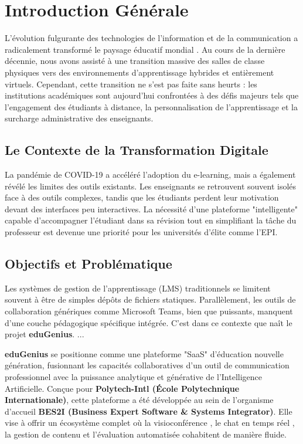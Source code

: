 \chapter*{Introduction Générale}

L'évolution fulgurante des technologies de l'information et de la communication a radicalement transformé le paysage éducatif mondial \cite{ai_education}. Au cours de la dernière décennie, nous avons assisté à une transition massive des salles de classe physiques vers des environnements d'apprentissage hybrides et entièrement virtuels. Cependant, cette transition ne s'est pas faite sans heurts : les institutions académiques sont aujourd'hui confrontées à des défis majeurs tels que l'engagement des étudiants à distance, la personnalisation de l'apprentissage et la surcharge administrative des enseignants.

\section*{Le Contexte de la Transformation Digitale}
La pandémie de COVID-19 a accéléré l'adoption du e-learning, mais a également révélé les limites des outils existants. Les enseignants se retrouvent souvent isolés face à des outils complexes, tandis que les étudiants perdent leur motivation devant des interfaces peu interactives. La nécessité d'une plateforme "intelligente" capable d'accompagner l'étudiant dans sa révision tout en simplifiant la tâche du professeur est devenue une priorité pour les universités d'élite comme l'EPI.

\section*{Objectifs et Problématique}
Les systèmes de gestion de l'apprentissage (LMS) traditionnels se limitent souvent à être de simples dépôts de fichiers statiques. Parallèlement, les outils de collaboration génériques comme Microsoft Teams, bien que puissants, manquent d'une couche pédagogique spécifique intégrée. C'est dans ce contexte que naît le projet \textbf{eduGenius}.
...

\textbf{eduGenius} se positionne comme une plateforme "SaaS" d'éducation nouvelle génération, fusionnant les capacités collaboratives d'un outil de communication professionnel avec la puissance analytique et générative de l'Intelligence Artificielle. Conçue pour \textbf{Polytech-Intl (École Polytechnique Internationale)}, cette plateforme a été développée au sein de l'organisme d'accueil \textbf{BES2I (Business Expert Software \& Systems Integrator)}. Elle vise à offrir un écosystème complet où la visioconférence \cite{daily_co}, le chat en temps réel \cite{socket_io}, la gestion de contenu et l'évaluation automatisée cohabitent de manière fluide.

